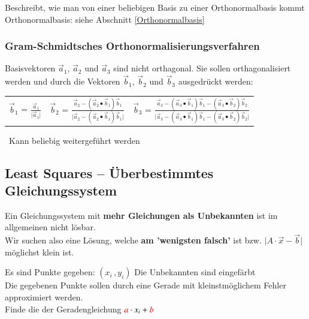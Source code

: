Beschreibt, wie man von einer beliebigen Basis zu einer Orthonormalbasis kommt \\		
Orthonormalbasis: siehe Abschnitt \ref{Orthonormalbasis}
		

\subsubsection{Gram-Schmidtsches Orthonormalisierungsverfahren}

Basisvektoren $\vec{a}_1$, $\vec{a}_2$ und $\vec{a}_3$ sind nicht orthagonal. Sie sollen
orthagonalisiert werden und durch die Vektoren $\vec{b}_1$, $\vec{b}_2$ und $\vec{b}_3$ 
ausgedrückt werden:
\vspace{0.2cm}
		
\begin{tabular}{lll}
	$\vec{b}_1$ = $\frac{\vec{a}_1}{\vert \vec{a}_1 \vert}$ &
	$\vec{b}_2$  = $\frac{\vec{a}_2 - ( \vec{a}_2 \bullet \vec{b}_1 ) \vec{b}_1}{\vert \vec{a}_2 - ( \vec{a}_2 \bullet \vec{b}_1 ) \vec{b}_1 \vert}$ &
	$\vec{b}_3$ = $\frac{\vec{a}_3 - ( \vec{a}_3 \bullet \vec{b}_1 ) \vec{b}_1 - ( \vec{a}_3 \bullet \vec{b}_2 ) \vec{b}_2}  {\vert \vec{a}_3 - ( \vec{a}_3 \bullet \vec{b}_1 ) \vec{b}_1 - ( \vec{a}_3 \bullet \vec{b}_2 ) \vec{b}_2 \vert}$ 
\end{tabular}

\vspace{0.2cm}
\textrightarrow\ Kann beliebig weitergeführt werden	


\subsection{Least Squares -- Überbestimmtes Gleichungssystem}

Ein Gleichungssystem mit \textbf{mehr Gleichungen als Unbekannten} ist im allgemeinen nicht lösbar. \\	
Wir suchen also eine Lösung, welche \textbf{am 'wenigsten falsch'} ist bzw. $\vert A \cdot \vec{x} - \vec{b} \vert$ möglichst klein ist. 
			


Es sind Punkte gegeben: $(x_i \, , y_i)$ Die Unbekannten sind  eingefärbt \\
Die gegebenen Punkte sollen durch eine Gerade mit kleinstmöglichem Fehler approximiert werden. \\
Finde die  der Geradengleichung ${\color{red}a} \cdot x_i + {\color{red}b}$ 

